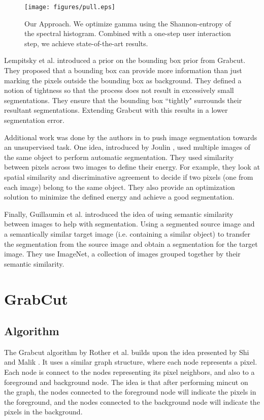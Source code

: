 \documentclass[10pt,twocolumn,letterpaper]{article}
\begin{document}
\begin{figure}[t]
\centering
\texttt{[image: figures/pull.eps]}
\caption{Our Approach. We optimize gamma using the Shannon-entropy of the spectral histogram. Combined with a one-step user interaction step, we achieve state-of-the-art results.}
\label{fig:pull}
\end{figure}

Lempitsky et al. \cite{lempitsky09} introduced a prior on the bounding box prior from  Grabcut. They proposed that a bounding box can provide more information than just marking the pixels outside the bounding box as background. They defined a notion of tightness so that the process does not result in excessively small segmentations. They ensure that the bounding box ``tightly" surrounds their resultant segmentations. Extending Grabcut with this results in a lower segmentation error.

Additional work was done by the authors in \cite{joulin10} to push image segmentation towards an unsupervised task. One idea, introduced by Joulin \etal, used multiple images of the same object to perform automatic segmentation. They used similarity between pixels across two images to define their energy. For example, they look at spatial similarity and discriminative agreement to decide if two pixels (one from each image) belong to the same object. They also provide an optimization solution to minimize the defined energy and achieve a good segmentation.

Finally, Guillaumin et al. \cite{guillaumin2014} introduced the idea of using semantic similarity between images to help with segmentation. Using a segmented source image and a semantically similar target image (i.e. containing a similar object) to transfer the segmentation from the source image and obtain a segmentation for the target image. They use ImageNet, a collection of images grouped together by their semantic similarity.

\section{GrabCut}\label{sec:grabcut}
\subsection{Algorithm}
The Grabcut algorithm by Rother et al. \cite{rother2004grabcut} builds upon the idea presented by Shi and Malik \cite{shimalik97}. It uses a similar graph structure, where each node represents a pixel. Each node is connect to the nodes representing its pixel neighbors, and also to a foreground and background node. The idea is that after performing mincut on the graph, the nodes connected to the foreground node will indicate the pixels in the foreground, and the nodes connected to the background node will indicate the pixels in the background.
\end{document}
